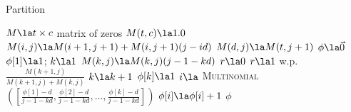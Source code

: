 \begin{algorithm}
	\caption{Partition} \label{alg:samplepartition}
	\begin{algorithmic}[1]
	
		\State $M \la  t \times c$ matrix of zeros
		\State $M(t,c) \la 1.0$
				\State $M(i,j) \la M(i +1, j+1) + M(i,j+1)(j - id)$ 
			\EndFor
			\State $M(d,j) \la M(t,j+1)$
		\EndFor
		\State $\phi \la \vec 0$ 
		\State $\phi[1] \la 1$;  $k \la 1$
			\State $M(k,j) \la M(k,j)(j-1 -k d)$
			\State $r \la 0$
			\State $r \la 1 $ w.p. $\frac{M(k+1,j)}{M(k+1,j) + M(k,j)}$
				\State $k \la k + 1$
				\State $\phi[k]  \la 1$
			\Else
				\State $i \la$ \textsc{Multinomial}$([\frac{\phi[1] - d}{j-1 -kd}, \frac{\phi[2] - d}{j-1 -kd}, \ldots, \frac{\phi[k] - d}{j-1 -kd}])$
				\State $\phi[i] \la \phi[i] + 1$
			\EndIf
		\EndFor
		\State \Return $\phi$
	\EndFunction
		\end{algorithmic}
\end{algorithm}

%
%
%				
%
